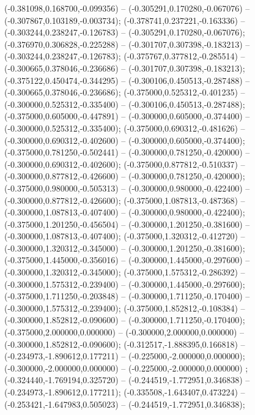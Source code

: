  (-0.381098,0.168700,-0.099356) -- (-0.305291,0.170280,-0.067076) -- (-0.307867,0.103189,-0.003734);
 (-0.378741,0.237221,-0.163336) -- (-0.303244,0.238247,-0.126783) -- (-0.305291,0.170280,-0.067076);
 (-0.376970,0.306828,-0.225288) -- (-0.301707,0.307398,-0.183213) -- (-0.303244,0.238247,-0.126783);
 (-0.375767,0.377812,-0.285514) -- (-0.300665,0.378046,-0.236686) -- (-0.301707,0.307398,-0.183213);
 (-0.375122,0.450474,-0.344295) -- (-0.300106,0.450513,-0.287488) -- (-0.300665,0.378046,-0.236686);
 (-0.375000,0.525312,-0.401235) -- (-0.300000,0.525312,-0.335400) -- (-0.300106,0.450513,-0.287488);
 (-0.375000,0.605000,-0.447891) -- (-0.300000,0.605000,-0.374400) -- (-0.300000,0.525312,-0.335400);
 (-0.375000,0.690312,-0.481626) -- (-0.300000,0.690312,-0.402600) -- (-0.300000,0.605000,-0.374400);
 (-0.375000,0.781250,-0.502441) -- (-0.300000,0.781250,-0.420000) -- (-0.300000,0.690312,-0.402600);
 (-0.375000,0.877812,-0.510337) -- (-0.300000,0.877812,-0.426600) -- (-0.300000,0.781250,-0.420000);
 (-0.375000,0.980000,-0.505313) -- (-0.300000,0.980000,-0.422400) -- (-0.300000,0.877812,-0.426600);
 (-0.375000,1.087813,-0.487368) -- (-0.300000,1.087813,-0.407400) -- (-0.300000,0.980000,-0.422400);
 (-0.375000,1.201250,-0.456504) -- (-0.300000,1.201250,-0.381600) -- (-0.300000,1.087813,-0.407400);
 (-0.375000,1.320312,-0.412720) -- (-0.300000,1.320312,-0.345000) -- (-0.300000,1.201250,-0.381600);
 (-0.375000,1.445000,-0.356016) -- (-0.300000,1.445000,-0.297600) -- (-0.300000,1.320312,-0.345000);
 (-0.375000,1.575312,-0.286392) -- (-0.300000,1.575312,-0.239400) -- (-0.300000,1.445000,-0.297600);
 (-0.375000,1.711250,-0.203848) -- (-0.300000,1.711250,-0.170400) -- (-0.300000,1.575312,-0.239400);
 (-0.375000,1.852812,-0.108384) -- (-0.300000,1.852812,-0.090600) -- (-0.300000,1.711250,-0.170400);
 (-0.375000,2.000000,0.000000) -- (-0.300000,2.000000,0.000000) -- (-0.300000,1.852812,-0.090600);
 (-0.312517,-1.888395,0.166818) -- (-0.234973,-1.890612,0.177211) -- (-0.225000,-2.000000,0.000000);
 (-0.300000,-2.000000,0.000000) -- (-0.225000,-2.000000,0.000000) ;
 (-0.324440,-1.769194,0.325720) -- (-0.244519,-1.772951,0.346838) -- (-0.234973,-1.890612,0.177211);
 (-0.335508,-1.643407,0.473224) -- (-0.253421,-1.647983,0.505023) -- (-0.244519,-1.772951,0.346838);
